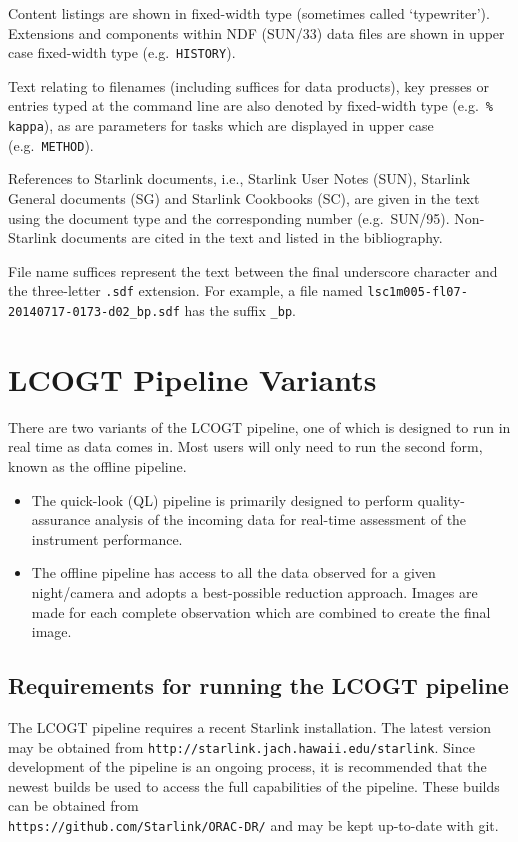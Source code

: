 \documentclass[twoside,11pt]{article}
\newcommand{\htmladdnormallink}[2]{#1}
\newcommand{\xref}[3]{#1}
\newcommand{\xlabel}[1]{}
\renewcommand{\_}{\texttt{\symbol{95}}}
\newcommand{\ndfref}{\xref{SUN/33}{sun33}{}}
\newcommand{\aparam}[1]{\texttt{#1}}     %
\newcommand{\ndfcomp}[1]{\texttt{#1}}    %
\begin{document}
Content listings are shown in fixed-width type (sometimes called
`typewriter'). Extensions and components within NDF (\ndfref) data
files are shown in upper case fixed-width type (e.g.\
\ndfcomp{HISTORY}).

Text relating to filenames (including suffices for data products), key
presses or entries typed at the command line are also denoted by
fixed-width type (e.g.\ \texttt{\% kappa}), as are parameters for
tasks which are displayed in upper case (e.g.\ \aparam{METHOD}).

References to Starlink documents, i.e., Starlink User Notes (SUN),
Starlink General documents (SG) and Starlink Cookbooks (SC), are given
in the text using the document type and the corresponding number
(e.g.\ SUN/95). Non-Starlink documents are cited in the text and
listed in the bibliography.

File name suffices represent the text between the final underscore
character and the three-letter \verb+.sdf+ extension. For example, a
file named \verb+lsc1m005-fl07-20140717-0173-d02_bp.sdf+ has the suffix
\verb+_bp+.

\section{\xlabel{pipelines}LCOGT Pipeline Variants\label{se:pipelines}}

There are two variants of the LCOGT pipeline, one of which is
designed to run in real time as data comes in. Most users will only need to
run the second form, known as the offline pipeline.

\begin{itemize}
\item The quick-look (QL) pipeline is primarily designed to perform
  quality-assurance analysis of the incoming data for real-time
  assessment of the instrument performance. 

\item The offline pipeline has access to all the data observed for a
  given night/camera and adopts a best-possible reduction approach. Images
  are made for each complete observation which are combined to create
  the final image.
\end{itemize}

\subsection{Requirements for running the LCOGT pipeline}

The LCOGT pipeline requires a recent Starlink installation. The
latest version may be obtained from
\htmladdnormallink{\texttt{http://starlink.jach.hawaii.edu/starlink}}{http://starlink.jach.hawaii.edu/starlink}. Since
development of the pipeline is an ongoing process, it is recommended
that the newest builds be used to access the full capabilities of the
pipeline. These builds can be obtained from\\
\htmladdnormallink{\texttt{https://github.com/Starlink/ORAC-DR/}}{https://github.com/Starlink/ORAC-DR/}
and may be kept up-to-date with git.
\end{document}

